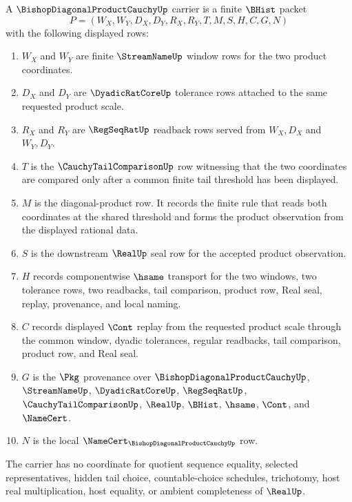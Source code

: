 \begin{definition}
\label{def:bishop-diagonal-product-cauchy-carrier}
A $\BishopDiagonalProductCauchyUp$ carrier is a finite $\BHist$ packet
$$
P=(W_X,W_Y,D_X,D_Y,R_X,R_Y,T,M,S,H,C,G,N)
$$
with the following displayed rows:
\begin{enumerate}
\item $W_X$ and $W_Y$ are finite $\StreamNameUp$ window rows for the two product coordinates.
\item $D_X$ and $D_Y$ are $\DyadicRatCoreUp$ tolerance rows attached to the same requested product scale.
\item $R_X$ and $R_Y$ are $\RegSeqRatUp$ readback rows served from $W_X,D_X$ and $W_Y,D_Y$.
\item $T$ is the $\CauchyTailComparisonUp$ row witnessing that the two coordinates are compared only after a common finite tail threshold has been displayed.
\item $M$ is the diagonal-product row. It records the finite rule that reads both coordinates at the shared threshold and forms the product observation from the displayed rational data.
\item $S$ is the downstream $\RealUp$ seal row for the accepted product observation.
\item $H$ records componentwise $\hsame$ transport for the two windows, two tolerance rows, two readbacks, tail comparison, product row, Real seal, replay, provenance, and local naming.
\item $C$ records displayed $\Cont$ replay from the requested product scale through the common window, dyadic tolerances, regular readbacks, tail comparison, product row, and Real seal.
\item $G$ is the $\Pkg$ provenance over $\BishopDiagonalProductCauchyUp$, $\StreamNameUp$, $\DyadicRatCoreUp$, $\RegSeqRatUp$, $\CauchyTailComparisonUp$, $\RealUp$, $\BHist$, $\hsame$, $\Cont$, and $\NameCert$.
\item $N$ is the local $\NameCert_{\BishopDiagonalProductCauchyUp}$ row.
\end{enumerate}
The carrier has no coordinate for quotient sequence equality, selected representatives, hidden tail choice, countable-choice schedules, trichotomy, host real multiplication, host equality, or ambient completeness of $\RealUp$.
\end{definition}

